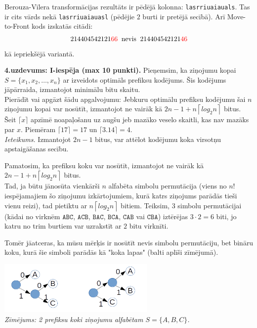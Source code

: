 \documentclass[11pt]{article}
\begin{document}
Berouza-Vīlera transformācijas rezultāts ir pēdējā kolonna: {\tt lasrriuaiauals}. 
Tas ir cits vārds nekā {\tt lasrriuaiauasl} (pēdējie $2$ burti ir pretējā secībā). 
Arī Move-to-Front kods izskatās citādi: 
$$214404542121\textcolor{red}{66}\;\;\text{nevis}\;\;214404542121\textcolor{red}{46}$$
kā iepriekšējā variantā.





{\footnotesize
\vspace{10ex}
\noindent
{\bf 4.uzdevums: I-iespēja (max 10 punkti).} 
Pieņemsim, ka ziņojumu kopai $S = \{ x_1, x_2, \ldots, x_n \}$ ar 
izveidots optimāls prefiksu kodējums. Šis kodējums jāpārraida,
izmantojot minimālu bitu skaitu.\\
Pierādīt vai apgāzt šādu 
apgalvojumu: Jebkuru optimālu prefiksu 
kodējumu šai $n$ ziņojumu kopai var nosūtīt, izmantojot ne vairāk kā 
${\displaystyle 2n - 1 + n \left\lceil log_2 n \right\rceil}$ bitus. 
Šeit $\lceil x \rceil$ apzīmē noapaļošanu uz augšu jeb 
mazāko veselo skaitli, kas nav mazāks par $x$.
Piemēram $\lceil 17 \rceil = 17$ un $\lceil 3.14 \rceil = 4$.\\
{\em Ieteikums.} Izmantojot $2n-1$ bitus, var attēlot kodējumu koka 
virsotņu apstaigāšanas secību.
}

Pamatosim, ka prefiksu koku var nosūtīt, izmantojot ne vairāk kā
${\displaystyle 2n - 1 + n \left\lceil log_2 n \right\rceil}$ bitus.\\

Tad, ja būtu jānosūta vienkārši $n$ alfabēta simbolu permutācija (viens no $n!$ 
iespējamajiem šo ziņojumu izkārtojumiem, kurā katrs ziņojums parādās tieši vienu reizi), 
tad pietiktu ar $n \left\lceil log_2 n \right\rceil$ bitiem. Teiksim, 
$3$ simbolu permutācijai (kādai no virknēm $\mathtt{ABC}$, 
$\mathtt{ACB}$, $\mathtt{BAC}$, $\mathtt{BCA}$, $\mathtt{CAB}$ vai $\mathtt{CBA}$)
iztērējas $3 \cdot 2 = 6$ biti, jo katru no trim burtiem var uzrakstīt 
ar $2$ bitu virknīti. 

Tomēr jāatceras, ka mūsu mērķis ir nosūtīt nevis simbolu permutāciju, bet 
bināru koku, kurā šie simboli parādās kā "koka lapas" (balti aplīši zīmējumā). 

\begin{center}
\includegraphics[width=3in]{fall2019-hw01/prefix-trees.png}\\
{\em Zīmējums: 2 prefiksu koki ziņojumu alfabētam $S = \{ A,B,C\}$.}
\end{center}
\end{document}
